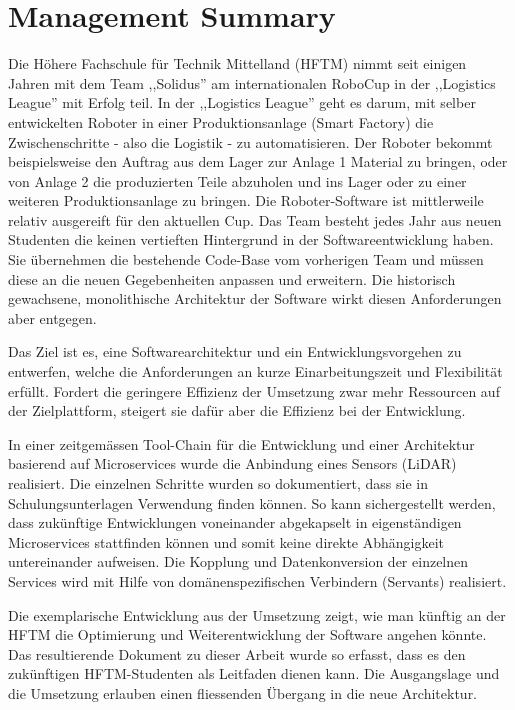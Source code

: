 \chapter*{Management Summary}
Die Höhere Fachschule für Technik Mittelland (HFTM) nimmt seit einigen Jahren mit dem Team ,,Solidus'' am internationalen RoboCup in der ,,Logistics League'' mit Erfolg teil. In der ,,Logistics League'' geht es darum, mit selber entwickelten Roboter in einer Produktionsanlage (Smart Factory) die Zwischenschritte - also die Logistik - zu automatisieren. Der Roboter bekommt beispielsweise den Auftrag aus dem Lager zur Anlage 1 Material zu bringen, oder von Anlage 2 die produzierten Teile abzuholen und ins Lager oder zu einer weiteren Produktionsanlage zu bringen. Die Roboter-Software ist mittlerweile relativ ausgereift für den aktuellen Cup. Das Team besteht jedes Jahr aus neuen Studenten die keinen vertieften Hintergrund in der Softwareentwicklung haben. Sie übernehmen die bestehende Code-Base vom vorherigen Team und müssen diese an die neuen Gegebenheiten anpassen und erweitern. Die historisch gewachsene, monolithische Architektur der Software wirkt diesen Anforderungen aber entgegen.

Das Ziel ist es, eine Softwarearchitektur und ein Entwicklungsvorgehen zu entwerfen, welche die Anforderungen an kurze Einarbeitungszeit und Flexibilität erfüllt. Fordert die geringere Effizienz der Umsetzung zwar mehr Ressourcen auf der Zielplattform, steigert sie dafür aber die Effizienz bei der Entwicklung.

In einer zeitgemässen Tool-Chain für die Entwicklung und einer Architektur basierend auf Microservices wurde die Anbindung eines Sensors (LiDAR) realisiert. Die einzelnen Schritte wurden so dokumentiert, dass sie in Schulungsunterlagen Verwendung finden können. So kann sichergestellt werden, dass zukünftige Entwicklungen voneinander abgekapselt in eigenständigen Microservices stattfinden können und somit keine direkte Abhängigkeit untereinander aufweisen. Die Kopplung und Datenkonversion der einzelnen Services wird mit Hilfe von domänenspezifischen Verbindern (Servants) realisiert.

Die exemplarische Entwicklung aus der Umsetzung zeigt, wie man künftig an der HFTM die Optimierung und Weiterentwicklung der Software angehen könnte. Das resultierende Dokument zu dieser Arbeit wurde so erfasst, dass es den zukünftigen HFTM-Studenten als Leitfaden dienen kann. Die Ausgangslage und die Umsetzung erlauben einen fliessenden Übergang in die neue Architektur.